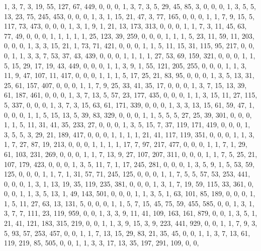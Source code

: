 \begin{code}
\begin{hide}
{     {1, 3, 7, 3, 19, 55, 127, 67, 449, 0, 0, 0},
     {1, 3, 7, 3, 5, 29, 45, 85, 3, 0, 0, 0},
     {1, 3, 5, 5, 13, 23, 75, 245, 453, 0, 0, 0},
     {1, 3, 1, 15, 21, 47, 3, 77, 165, 0, 0, 0},
     {1, 1, 7, 9, 15, 5, 117, 73, 473, 0, 0, 0},
     {1, 3, 1, 9, 1, 21, 13, 173, 313, 0, 0, 0},
     {1, 1, 7, 3, 11, 45, 63, 77, 49, 0, 0, 0},
     {1, 1, 1, 1, 1, 25, 123, 39, 259, 0, 0, 0},
     {1, 1, 1, 5, 23, 11, 59, 11, 203, 0, 0, 0},
     {1, 3, 3, 15, 21, 1, 73, 71, 421, 0, 0, 0},
     {1, 1, 5, 11, 15, 31, 115, 95, 217, 0, 0, 0},
     {1, 1, 3, 3, 7, 53, 37, 43, 439, 0, 0, 0},
     {1, 1, 1, 1, 27, 53, 69, 159, 321, 0, 0, 0},
     {1, 1, 5, 15, 29, 17, 19, 43, 449, 0, 0, 0},
     {1, 1, 3, 9, 1, 55, 121, 205, 255, 0, 0, 0},
     {1, 1, 3, 11, 9, 47, 107, 11, 417, 0, 0, 0},
     {1, 1, 1, 5, 17, 25, 21, 83, 95, 0, 0, 0},
     {1, 3, 5, 13, 31, 25, 61, 157, 407, 0, 0, 0},
     {1, 1, 7, 9, 25, 33, 41, 35, 17, 0, 0, 0},
     {1, 3, 7, 15, 13, 39, 61, 187, 461, 0, 0, 0},
     {1, 3, 7, 13, 5, 57, 23, 177, 435, 0, 0, 0},
     {1, 1, 3, 15, 11, 27, 115, 5, 337, 0, 0, 0},
     {1, 3, 7, 3, 15, 63, 61, 171, 339, 0, 0, 0},
     {1, 3, 3, 13, 15, 61, 59, 47, 1, 0, 0, 0},
     {1, 1, 5, 15, 13, 5, 39, 83, 329, 0, 0, 0},
     {1, 1, 5, 5, 5, 27, 25, 39, 301, 0, 0, 0},
     {1, 1, 5, 11, 31, 41, 35, 233, 27, 0, 0, 0},
     {1, 3, 5, 15, 7, 37, 119, 171, 419, 0, 0, 0},
     {1, 3, 5, 5, 3, 29, 21, 189, 417, 0, 0, 0},
     {1, 1, 1, 1, 21, 41, 117, 119, 351, 0, 0, 0},
     {1, 1, 3, 1, 7, 27, 87, 19, 213, 0, 0, 0},
     {1, 1, 1, 1, 17, 7, 97, 217, 477, 0, 0, 0},
     {1, 1, 7, 1, 29, 61, 103, 231, 269, 0, 0, 0},
     {1, 1, 7, 13, 9, 27, 107, 207, 311, 0, 0, 0},
     {1, 1, 7, 5, 25, 21, 107, 179, 423, 0, 0, 0},
     {1, 3, 5, 11, 7, 1, 17, 245, 281, 0, 0, 0},
     {1, 3, 5, 9, 1, 5, 53, 59, 125, 0, 0, 0},
     {1, 1, 7, 1, 31, 57, 71, 245, 125, 0, 0, 0},
     {1, 1, 7, 5, 5, 57, 53, 253, 441, 0, 0, 0},
     {1, 3, 1, 13, 19, 35, 119, 235, 381, 0, 0, 0},
     {1, 3, 1, 7, 19, 59, 115, 33, 361, 0, 0, 0},
     {1, 1, 3, 5, 13, 1, 49, 143, 501, 0, 0, 0},
     {1, 1, 3, 5, 1, 63, 101, 85, 189, 0, 0, 0},
     {1, 1, 5, 11, 27, 63, 13, 131, 5, 0, 0, 0},
     {1, 1, 5, 7, 15, 45, 75, 59, 455, 585, 0, 0},
     {1, 3, 1, 3, 7, 7, 111, 23, 119, 959, 0, 0},
     {1, 3, 3, 9, 11, 41, 109, 163, 161, 879, 0, 0},
     {1, 3, 5, 1, 21, 41, 121, 183, 315, 219, 0, 0},
     {1, 1, 3, 9, 15, 3, 9, 223, 441, 929, 0, 0},
     {1, 1, 7, 9, 3, 5, 93, 57, 253, 457, 0, 0},
     {1, 1, 7, 13, 15, 29, 83, 21, 35, 45, 0, 0},
     {1, 1, 3, 7, 13, 61, 119, 219, 85, 505, 0, 0},
     {1, 1, 3, 3, 17, 13, 35, 197, 291, 109, 0, 0},
}
\end{hide}
\end{code}
